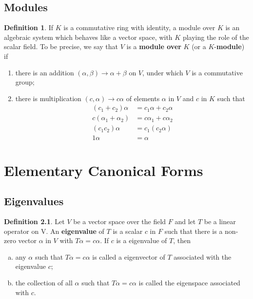 \documentclass{book}
\theoremstyle{remark}
\theoremstyle{definition}
\newtheorem{definition}{Definition}[section]
\begin{document}
\section{Modules}
\begin{definition}
If $K$ is a commutative ring with identity, a module over $K$ is an algebraic system which behaves like a vector space, with $K$ playing the role of the scalar field. To be precise, we say that $V$ is a \textbf{module over} $K$ (or a $K$-\textbf{module}) if 
\begin{enumerate}
    \item there is an addition $(\alpha, \beta) \rightarrow \alpha + \beta$ on $V$, under which $V$ is a commutative group;
    \item there is multiplication $(c, \alpha) \rightarrow c\alpha$ of elements $\alpha$ in $V$ and $c$ in $K$ such that
    \begin{align*}
        (c_1 + c_2) \alpha &= c_1 \alpha + c_2 \alpha\\
        c(\alpha_1 + \alpha_2) &= c\alpha_1 + c\alpha_2\\
        (c_1 c_2)\alpha &= c_1(c_2 \alpha)\\
        1 \alpha &= \alpha
    \end{align*}
\end{enumerate}
\end{definition}
\chapter{Elementary Canonical Forms}
\section{Eigenvalues}
\begin{definition}
    Let $V$ be a vector space over the field $F$ and let $T$ be a linear operator on V. An \textbf{eigenvalue} of $T$ is a scalar $c$ in $F$ such that there is a non-zero vector $\alpha$ in $V$ with $T \alpha=c \alpha$. If $c$ is a  eigenvalue of $T$, then
    \begin{enumerate}[(a)]
        \item any $\alpha$ such that $T \alpha=c \alpha$ is called a eigenvector of $T$ associated with the eigenvalue $c$;
        \item the collection of all $\alpha$ such that $T \alpha=c \alpha$ is called the eigenspace associated with $c$.
    \end{enumerate}


\end{definition}
\end{document}
